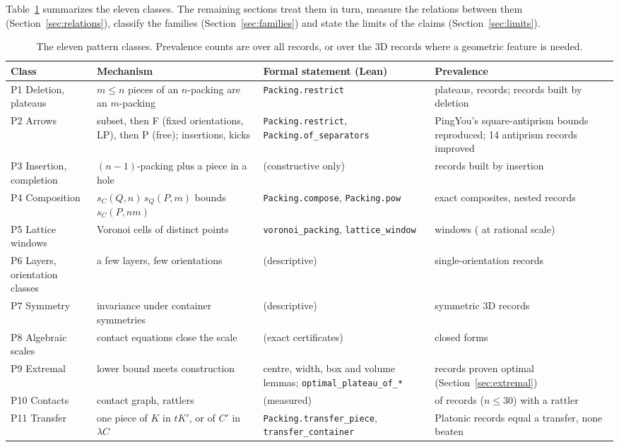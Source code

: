 \documentclass[11pt,a4paper]{article}
\newcommand{\lean}[1]{\texttt{#1}}
\theoremstyle{definition}
\theoremstyle{remark}
\begin{document}
Table~\ref{tab:taxonomy} summarizes the eleven classes. The remaining sections treat them in turn, measure the relations between them (Section~\ref{sec:relations}), classify the families (Section~\ref{sec:families}) and state the limits of the claims (Section~\ref{sec:limits}).

\begin{table}[t]
\centering\footnotesize
\begin{tabularx}{\textwidth}{>{\raggedright}p{2.6cm} >{\raggedright}X >{\raggedright}p{3.6cm} >{\raggedright\arraybackslash}p{3.4cm}}
\toprule
Class & Mechanism & Formal statement (Lean) & Prevalence \\
\midrule
P1 Deletion, plateaus & $m\le n$ pieces of an $n$-packing are an $m$-packing & \lean{Packing.restrict} & \nPlateaus{} plateaus, \nPlateauRecords{} records; \nMonotone{} records built by deletion \\
P2 Arrows & subset, then F (fixed orientations, LP), then P (free); insertions, kicks & \lean{Packing.restrict}, \lean{Packing.of\_separators} & PingYou's square-antiprism bounds reproduced; 14 antiprism records improved \\
P3 Insertion, completion & $(n-1)$-packing plus a piece in a hole & (constructive only) & \nAscend{} records built by insertion \\
P4 Composition & $s_{C}(Q,n)\,s_{Q}(P,m)$ bounds $s_C(P,nm)$ & \lean{Packing.compose}, \lean{Packing.pow} & \nComposites{} exact composites, \nNested{} nested records \\
P5 Lattice windows & Voronoi cells of distinct points & \lean{voronoi\_packing}, \lean{lattice\_window} & \nLattice{} windows (\nLatticeRational{} at rational scale) \\
P6 Layers, orientation classes & a few layers, few orientations & (descriptive) & \nOneOrient{} single-orientation records \\
P7 Symmetry & invariance under container symmetries & (descriptive) & \nSymNontrivial{} symmetric 3D records \\
P8 Algebraic scales & contact equations close the scale & (exact certificates) & \nClosedForms{} closed forms \\
P9 Extremal & lower bound meets construction & centre, width, box and volume lemmas; \lean{optimal\_plateau\_of\_*} & \nProven{} records proven optimal (Section~\ref{sec:extremal}) \\
P10 Contacts & contact graph, rattlers & (measured) & \nConRattler{} of \nCon{} records ($n\le30$) with a rattler \\
P11 Transfer & one piece of $K$ in $tK'$, or of $C'$ in $\lambda C$ & \lean{Packing.transfer\_piece}, \lean{transfer\_container} & \nTrMatch{} Platonic records equal a transfer, none beaten \\
\bottomrule
\end{tabularx}
\caption{The eleven pattern classes. Prevalence counts are over all \nRecords{} records, or over the \nFeat{} 3D records where a geometric feature is needed.}
\label{tab:taxonomy}
\end{table}
\end{document}
